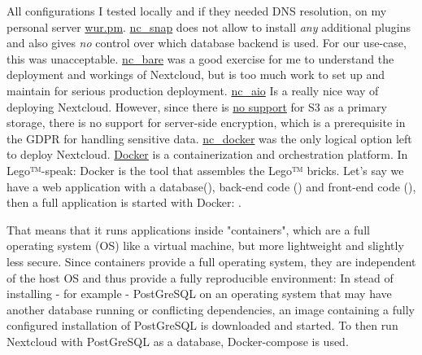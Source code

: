 \documentclass[journal, dvipsnames]{IEEEtran}
\newcommand{\descref}[1]{\hyperref[#1]{\csname#1\endcsname}}
\begin{document}
All configurations I tested locally and if they needed DNS resolution, on my personal server \href{https://wur.pm}{wur.pm}. 
\descref{nc_snap} does not allow to install \textit{any} additional plugins and also gives \textit{no} control over which database backend is used. For our use-case, this was unacceptable.
\descref{nc_bare} was a good exercise for me to understand the deployment and workings of Nextcloud, but is too much work to set up and maintain for serious production deployment.
\descref{nc_aio} Is a really nice way of deploying Nextcloud. However, since there is \href{https://github.com/nextcloud/all-in-one/discussions/1807}{no support} for S3 as a primary storage, there is no support for server-side encryption, which is a prerequisite in the GDPR for handling sensitive data.
\descref{nc_docker} was the only logical option left to deploy Nextcloud. \href{https://www.docker.com/}{Docker} is a containerization and orchestration platform. In Lego™-speak: Docker is the tool that assembles the Lego™ bricks. Let's say we have a web application with a database(), back-end code () and front-end code (), then a full application is started with Docker: .

That means that it runs applications inside "containers", which are a full operating system (OS) like a virtual machine, but more lightweight and slightly less secure. Since containers provide a full operating system, they are independent of the host OS and thus provide a fully reproducible environment: In stead of installing - for example - PostGreSQL on an operating system that may have another database running or conflicting dependencies, an image containing a fully configured installation of PostGreSQL is downloaded and started. To then run Nextcloud with PostGreSQL as a database, Docker-compose is used.
\end{document}

